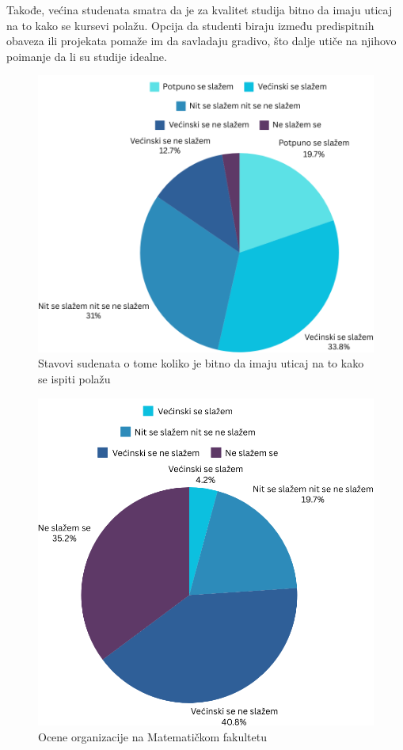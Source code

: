 \documentclass[a4paper]{article}
\begin{document}
{Takođe, većina studenata smatra da je za kvalitet studija bitno da imaju uticaj na to kako se kursevi polažu. Opcija da studenti biraju između predispitnih obaveza ili projekata pomaže im da savladaju gradivo, što dalje utiče na njihovo poimanje da li su studije idealne.
\begin{figure}[h!]
\begin{center}
    \includegraphics[scale = 0.3]{PieChartUticajNaPolaganje.png}
    \caption{Stavovi sudenata o tome koliko je bitno da imaju uticaj na to kako se ispiti polažu}
    \label{fig:uticaj}
\end{center}
\end{figure}


\begin{figure}[h!]
\begin{center}
    \includegraphics[scale = 0.3]{PieChartOrganizacijaMatf.png}
    \caption{Ocene organizacije na Matematičkom fakultetu}
    \label{fig:organizacija_matf}
\end{center}
\end{figure}

}
\end{document}
